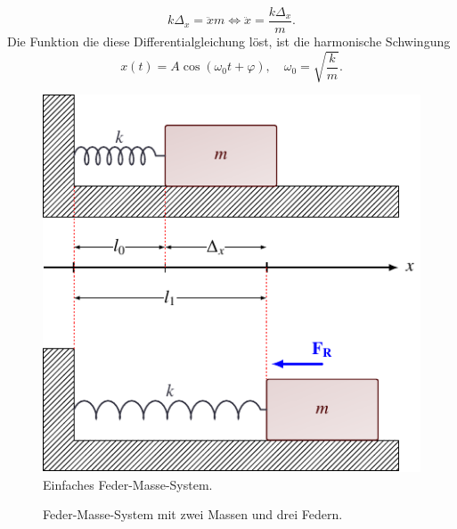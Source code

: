 \begin{equation*}
    k \Delta_x = \ddot{x} m \Leftrightarrow \ddot{x} = \frac{k \Delta_x}{m}.
\end{equation*}
Die Funktion die diese Differentialgleichung löst, ist die harmonische Schwingung
\begin{equation}
    x(t) = A \cos(\omega_0 t + \varphi), \quad \omega_0 = \sqrt{\frac{k}{m}}.
\end{equation}
\begin{figure}
    \centering
    \includegraphics{papers/kra/images/simple.pdf}
    \caption{Einfaches Feder-Masse-System.}
    \label{kra:fig:simple_mass_spring}
\end{figure}
\begin{figure}
    \centering
    
    \caption{Feder-Masse-System mit zwei Massen und drei Federn.}
    \label{kra:fig:multi_mass_spring}
\end{figure}

